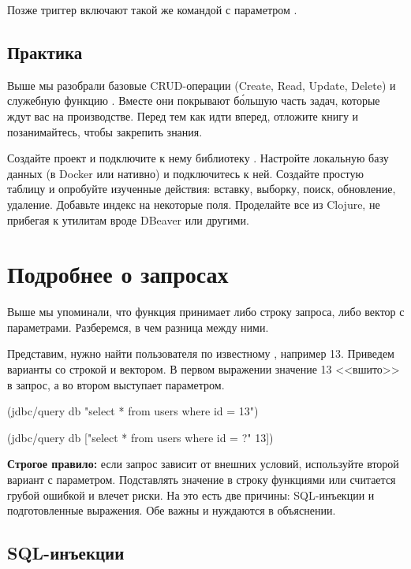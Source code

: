 Позже триггер включают такой же командой с параметром .

\subsection{Практика}

Выше мы разобрали базовые CRUD-операции (Create, Read, Update, Delete) и служебную функцию . Вместе они покрывают б\'{о}льшую часть задач, которые ждут вас на производстве. Перед тем как идти вперед, отложите книгу и позанимайтесь, чтобы закрепить знания.

Создайте проект и подключите к нему библиотеку . Настройте локальную базу данных (в Docker или нативно) и подключитесь к ней. Создайте простую таблицу и опробуйте изученные действия: вставку, выборку, поиск, обновление, удаление. Добавьте индекс на некоторые поля. Проделайте все из Clojure, не прибегая к утилитам вроде DBeaver или другими.

\section{Подробнее о запросах}

Выше мы упоминали, что функция  принимает либо строку запроса, либо вектор с параметрами. Разберемся, в чем разница между ними.

Представим, нужно найти пользователя по известному , например 13. Приведем варианты со строкой и вектором. В первом выражении значение 13 <<вшито>> в запрос, а во втором выступает параметром.

\begin{english}
  \begin{clojure}
(jdbc/query db "select * from users where id = 13")

(jdbc/query db ["select * from users where id = ?" 13])
  \end{clojure}
\end{english}

\textbf{Строгое правило:} если запрос зависит от внешних условий, используйте второй вариант с параметром. Подставлять значение в строку функциями  или  считается грубой ошибкой и влечет риски. На это есть две причины: SQL-инъекции и подготовленные выражения. Обе важны и нуждаются в объяснении.

\subsection{SQL-инъекции}

